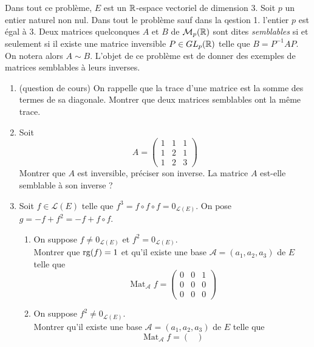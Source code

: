 Dans tout ce problème, $E$ est un $\mathbb{R}$-espace vectoriel de dimension $3$.\newline
Soit $p$ un entier naturel non nul. Dans tout le problème sauf dans la qestion 1. l'entier $p$ est égal à $3$.\newline
Deux matrices quelconques $A$ et $B$ de $\mathcal M_p(\mathbb{R})$ sont dites \emph{semblables} si et seulement si il existe une matrice inversible $P\in GL_p(\mathbb{R})$ telle que $B=P^{-1}AP$. On notera alors $A\sim B$.\newline
L'objet de ce problème est de donner des exemples de matrices semblables à leurs inverses. 
\begin{enumerate}
 \item (question de cours) On rappelle que la trace d'une matrice est la somme des termes de sa diagonale. Montrer que deux matrices semblables ont la même trace.
 \item Soit 
\begin{displaymath}
 A=
\begin{pmatrix}
 1&1&1\\1&2&1\\1&2&3
\end{pmatrix}
\end{displaymath}
Montrer que $A$ est inversible, préciser son inverse. La matrice $A$ est-elle semblable à son inverse ?
\item Soit $f\in \mathcal L(E)$ telle que $f^3=f\circ f\circ f = 0_{\mathcal L(E)}$. On pose $g = -f + f^2=-f+f\circ f$.
\begin{enumerate}
  \item On suppose $f\neq 0_{\mathcal L(E)}$ et $f^2= 0_{\mathcal L(E)}$.\\ Montrer que $\operatorname{rg}(f)=1$ et qu'il existe une base $\mathcal A = (a_1,a_2,a_3)$ de $E$ telle que
\begin{displaymath}
 \mathop{\mathrm{Mat}}_{\mathcal A}f
=
\begin{pmatrix}
 0&0&1\\0&0&0\\0&0&0
\end{pmatrix}
\end{displaymath}
  \item On suppose $f^2\neq 0_{\mathcal L(E)}$.\\ Montrer qu'il existe une base $\mathcal A = (a_1,a_2,a_3)$ de $E$ telle que
\begin{displaymath}
 \mathop{\mathrm{Mat}}_{\mathcal A}f
=
\begin{pmatrix}

\end{pmatrix}
\end{displaymath}
\end{enumerate}
\end{enumerate}

